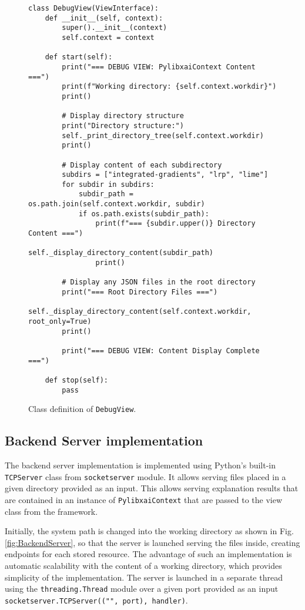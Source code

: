 \documentclass[
    bindingoffset=5mm,  %
    footnoteindent=3mm, %
    hyphenation=true    %
]{src/wut-thesis}
\begin{document}
\begin{figure}%
\begin{verbatim}
class DebugView(ViewInterface):
    def __init__(self, context):
        super().__init__(context)
        self.context = context

    def start(self):
        print("=== DEBUG VIEW: PylibxaiContext Content ===")
        print(f"Working directory: {self.context.workdir}")
        print()
        
        # Display directory structure
        print("Directory structure:")
        self._print_directory_tree(self.context.workdir)
        print()
        
        # Display content of each subdirectory
        subdirs = ["integrated-gradients", "lrp", "lime"]
        for subdir in subdirs:
            subdir_path = os.path.join(self.context.workdir, subdir)
            if os.path.exists(subdir_path):
                print(f"=== {subdir.upper()} Directory Content ===")
                self._display_directory_content(subdir_path)
                print()
        
        # Display any JSON files in the root directory
        print("=== Root Directory Files ===")
        self._display_directory_content(self.context.workdir, root_only=True)
        print()
        
        print("=== DEBUG VIEW: Content Display Complete ===")

    def stop(self):
        pass
\end{verbatim}
\caption{Class definition of \texttt{DebugView}.}
\label{fig:DebugView}
\end{figure}

\subsection{Backend Server implementation} \label{ch5:FileServer}

The backend server implementation is implemented using Python's built-in \texttt{TCPServer} class from
\texttt{socketserver} module. It allows serving files placed in a given directory provided as an input.
This allows serving explanation results that are contained in an instance of \texttt{PylibxaiContext} that
are passed to the view class from the framework.

Initially, the system path is changed into the working directory as shown in Fig. \ref{fig:BackendServer},
so that the server is launched serving the files inside, creating endpoints for each stored resource.
The advantage of such an implementation is automatic scalability with the content of a working directory,
which provides simplicity of the implementation. The server is launched in a separate thread using the 
\texttt{threading.Thread} module over a given port provided as an input
\texttt{socketserver.TCPServer(("", port), handler)}.
\end{document}
